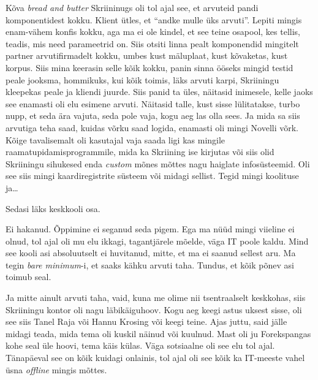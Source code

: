 Kõva \emph{bread and butter} Skriininugs oli tol ajal see, et arvuteid pandi  komponentidest kokku. Klient ütles, et \enquote{andke mulle üks arvuti}. Lepiti mingis enam-vähem konfis kokku, aga ma ei ole kindel, et see teine osapool, kes tellis, teadis, mis need parameetrid on. Siis otsiti linna pealt komponendid mingitelt partner arvutifirmadelt kokku, umbes kust mäluplaat, kust kõvaketas, kust korpus. Siis mina keerasin selle kõik kokku, panin sinna ööseks mingid testid peale jooksma, hommikuks, kui kõik toimis, läks arvuti karpi, Skriiningu kleepekas peale ja  kliendi juurde. Siis panid ta üles, näitasid inimesele, kelle jaoks see enamasti oli elu esimene arvuti. Näitasid talle, kust sisse lülitatakse,  turbo nupp, et seda ära vajuta, seda pole vaja, kogu aeg las olla sees. Ja mida sa siis arvutiga teha saad, kuidas võrku saad logida, enamasti oli mingi Novelli võrk. Kõige tavalisemalt  oli kasutajal vaja saada ligi kas mingile raamatupidamisprogrammile, mida ka Skriining ise kirjutas või siis olid Skriiningu sihukesed enda \emph{custom} mõnes mõttes nagu haiglate infosüsteemid. Oli see siis mingi kaardiregistrite süsteem või midagi sellist. Tegid mingi koolituse ja\ldots 

Sedasi läks keskkooli osa. 


Ei hakanud. Õppimine ei seganud seda pigem. Ega ma nüüd mingi viieline ei olnud, tol ajal oli mu elu ikkagi, tagantjärele mõelde, väga IT poole kaldu. Mind see kooli asi  absoluutselt ei huvitanud, mitte, et ma ei saanud sellest aru. Ma tegin \emph{bare minimum}-i, et saaks kähku arvuti taha. Tundus, et kõik põnev asi toimub seal. 

Ja mitte ainult arvuti taha, vaid, kuna me olime nii tsentraalselt keskkohas, siis Skriiningu kontor oli nagu läbikäiguhoov.  Kogu aeg keegi astus uksest sisse, oli see siis Tanel Raja või Hannu Krosing või keegi teine. Ajas juttu, said jälle midagi teada, mida tema oli kuskil näinud või kuulnud. Mast oli ju Forekspangas kohe seal üle hoovi, tema käis külas. Väga sotsiaalne oli see elu tol ajal. Tänapäeval see on kõik kuidagi onlainis, tol ajal oli see kõik ka IT-meeste vahel üsna \emph{offline} mingis mõttes. 

